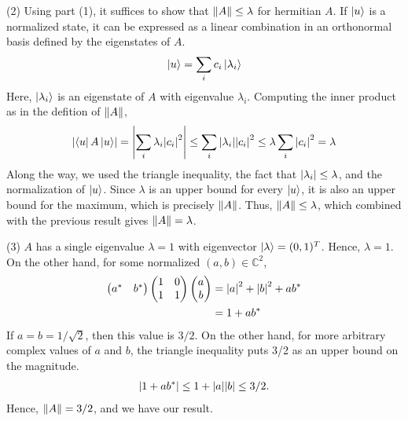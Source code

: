\documentclass{book}
\begin{document}
    (2) Using part (1), it suffices to show that $\norm{A} \leq \lambda$ for hermitian $A$. If $\ket{u}$ is a normalized state, it can be expressed as a linear combination in an orthonormal basis defined by the eigenstates of $A$.
    \begin{align}
        \ket{u} = \sum_i c_i\ket{\lambda_i}
    \end{align}
    Here, $\ket{\lambda_i}$ is an eigenstate of $A$ with eigenvalue $\lambda_i$. Computing the inner product as in the defition of $\norm{A}$,
    \begin{align}
        \abs{\bra{u}A\ket{u}} = \abs{\sum_i \lambda_i \abs{c_i}^2} \leq \sum_i \abs{\lambda_i}\abs{c_i}^2 \leq \lambda \sum_i \abs{c_i}^2 =\lambda
    \end{align}
    Along the way, we used the triangle inequality, the fact that $\abs{\lambda_i}\leq \lambda$, and the normalization of $\ket{u}$. Since $\lambda$ is an upper bound for every $\ket{u}$, it is also an upper bound for the maximum, which is precisely $\norm{A}$. Thus, $\norm{A}\leq \lambda$, which combined with the previous result gives $\norm{A} = \lambda$.
    
    (3) $A$ has a single eigenvalue $\lambda = 1$ with eigenvector $\ket{\lambda} = (0,1)^T$. Hence, $\lambda =1$. On the other hand, for some normalized $(a,b)\in \mathbb{C}^2$,
    \begin{align}
        \begin{pmatrix}
            a^* & b^*
        \end{pmatrix}
        \begin{pmatrix}
            1 & 0 \\
            1 & 1
        \end{pmatrix}
        \begin{pmatrix}
            a \\
            b
        \end{pmatrix} &= \abs{a}^2 + \abs{b}^2 + a b^* \\
        &= 1 + a b^*
    \end{align}
    If $a = b = 1/\sqrt{2}$, then this value is $3/2$. On the other hand, for more arbitrary complex values of $a$ and $b$, the triangle inequality puts 3/2 as an upper bound on the magnitude.
    \begin{align}
        \abs{1 + a b^*} \leq 1 + \abs{a}\abs{b} \leq 3/2.
    \end{align}
    Hence, $\norm{A} = 3/2$, and we have our result.
    
\end{document}
